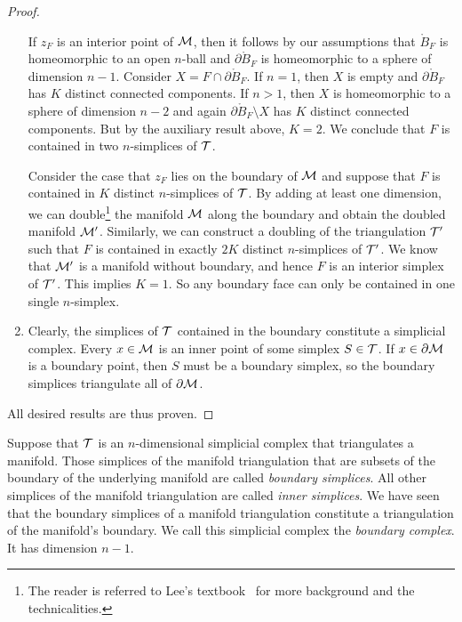 \documentclass[10pt,a4paper]{article}
\begin{document}
\begin{proof}
\begin{enumerate}
    If $z_F$ is an interior point of ${\mathcal M}$, 
    then it follows by our assumptions that $\mathring B_F$ is homeomorphic to an open $n$-ball and $\partial \mathring B_F$ is homeomorphic to a sphere of dimension $n-1$. 
    Consider $X = F \cap \partial \mathring B_F$.
    If $n=1$, then $X$ is empty and $\partial \mathring B_F$ has $K$ distinct connected components. 
    If $n > 1$, then $X$ is homeomorphic to a sphere of dimension $n-2$
    and again $\partial \mathring B_F \setminus X$ has $K$ distinct connected components. 
    But by the auxiliary result above, $K = 2$. 
    We conclude that $F$ is contained in two $n$-simplices of ${\mathcal T}$.
    
    Consider the case that $z_F$ lies on the boundary of ${\mathcal M}$ and suppose that $F$ is contained in $K$ distinct $n$-simplices of ${\mathcal T}$.
    By adding at least one dimension, we can double\footnote{The reader is referred to Lee's textbook~\cite{lee2012smooth} for more background and the technicalities.} the manifold ${\mathcal M}$ along the boundary and obtain the doubled manifold ${\mathcal M}'$. 
    Similarly, we can construct a doubling of the triangulation ${\mathcal T}'$ such that $F$ is contained in exactly $2K$ distinct $n$-simplices of ${\mathcal T}'$. 
    We know that ${\mathcal M}'$ is a manifold without boundary, and hence $F$ is an interior simplex of ${\mathcal T}'$.
    This implies $K=1$.
    So any boundary face can only be contained in one single $n$-simplex. 
    
    \item
    Clearly, the simplices of ${\mathcal T}$ contained in the boundary constitute a simplicial complex. 
    Every $x \in {\mathcal M}$ is an inner point of some simplex $S \in {\mathcal T}$. 
    If $x \in \partial {\mathcal M}$ is a boundary point, then $S$ must be a boundary simplex, 
    so the boundary simplices triangulate all of $\partial {\mathcal M}$.
    \end{enumerate}
    All desired results are thus proven. 
\end{proof}

Suppose that ${\mathcal T}$ is an $n$-dimensional simplicial complex that triangulates a manifold. 
Those simplices of the manifold triangulation that are subsets of the boundary of the underlying manifold are called \emph{boundary simplices}. 
All other simplices of the manifold triangulation are called \emph{inner simplices}. 
We have seen that the boundary simplices of a manifold triangulation constitute a triangulation of the manifold's boundary. 
We call this simplicial complex the \emph{boundary complex}. It has dimension $n-1$. 
\end{document}
